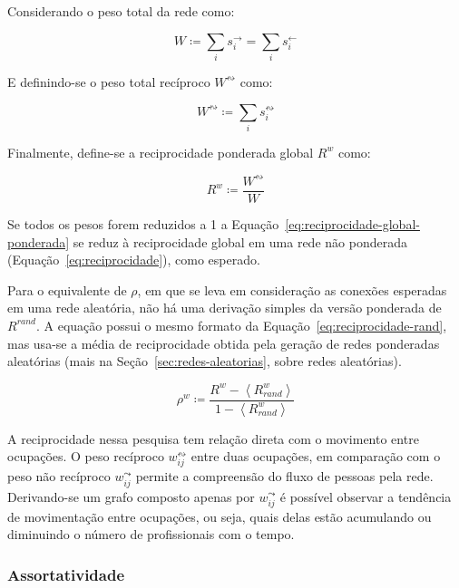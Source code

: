 \documentclass[12pt,a4paper]{article}
\theoremstyle{hypo}
\newcommand{\avg}[1]{\left\langle #1 \right\rangle} %
\newcommand{\defn}{\coloneqq} %
\newcommand{\linkin}[1]{#1^\leftarrow} %
\newcommand{\linkout}[1]{#1^\rightarrow} %
\newcommand{\weighted}[1]{#1^w} %
\newcommand{\recout}[1]{#1^\leadsto} %
\newcommand{\recboth}[1]{#1^\leftrightsquigarrow} %
\begin{document}
Considerando o peso total da rede como:

\begin{equation}
W \defn \sum_i \linkout{s}_i = \sum_i \linkin{s}_i
\end{equation}

E definindo-se o peso total recíproco $\recboth{W}$ como:

\begin{equation}
\recboth{W} \defn \sum_i \recboth{s}_i
\end{equation}

Finalmente, define-se a reciprocidade ponderada global $\weighted{R}$ como:

\begin{equation} \label{eq:reciprocidade-global-ponderada}
\weighted{R} \defn \frac{\recboth{W}}{W}
\end{equation}

Se todos os pesos forem reduzidos a 1 a Equação~\ref{eq:reciprocidade-global-ponderada} se reduz à reciprocidade global em uma rede não ponderada (Equação~\ref{eq:reciprocidade}), como esperado.

Para o equivalente de $\rho$, em que se leva em consideração as conexões esperadas em uma rede aleatória, não há uma derivação simples da versão ponderada de $R^\textit{rand}$. A equação possui o mesmo formato da Equação~\ref{eq:reciprocidade-rand}, mas usa-se a média de reciprocidade obtida pela geração de redes ponderadas aleatórias (mais na Seção~\ref{sec:redes-aleatorias}, sobre redes aleatórias).

\begin{equation}
\weighted{\rho} \defn \frac{\weighted{R} - \avg{\weighted{R}_\textit{rand}}}{1 -  \avg{\weighted{R}_\textit{rand}}}
\end{equation}

A reciprocidade nessa pesquisa tem relação direta com o movimento entre ocupações. O peso recíproco $\recboth{w}_{ij}$ entre duas ocupações, em comparação com o peso não recíproco $\recout{w}_{ij}$ permite a compreensão do fluxo de pessoas pela rede. Derivando-se um grafo composto apenas por $\recout{w}_{ij}$ é possível observar a tendência de movimentação entre ocupações, ou seja, quais delas estão acumulando ou diminuindo o número de profissionais com o tempo.

\subsubsection{Assortatividade}
\end{document}
